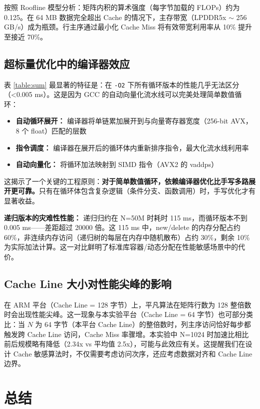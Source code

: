 \documentclass[a4paper]{article}
\begin{document}
按照 Roofline 模型分析：矩阵内积的算术强度（每字节加载的 FLOPs）约为 0.125。在 64 MB 数据完全超出 Cache 的情况下，主存带宽（LPDDR5x $\sim$ 256 GB/s）成为瓶颈。行主序通过最小化 Cache Miss 将有效带宽利用率从 10\% 提升至接近 70\%。

\subsection{超标量优化中的编译器效应}

表 \ref{table:sum} 最显著的特征是：在 \texttt{-O2} 下所有循环版本的性能几乎无法区分（<0.005 ms）。这是因为 GCC 的自动向量化流水线可以完美处理简单数值循环：
\begin{itemize}
    \item \textbf{自动循环展开：} 编译器将单链累加展开到与向量寄存器宽度（256-bit AVX，8 个 float）匹配的层数
    \item \textbf{指令调度：} 编译器在展开后的循环体内重新排序指令，最大化流水线利用率
    \item \textbf{自动向量化：} 将循环加法映射到 SIMD 指令（AVX2 的 vaddps）
\end{itemize}

这揭示了一个关键的工程原则：\textbf{对于简单数值循环，依赖编译器优化比手写多路展开更可靠。}只有在循环体包含复杂逻辑（条件分支、函数调用）时，手写优化才有显著收益。

\textbf{递归版本的灾难性性能：} 递归归约在 N=50M 时耗时 115 ms，而循环版本不到 0.005 ms——差距超过 20000 倍。这 115 ms 中，new/delete 的内存分配占约 60\%，非连续内存访问（递归树的每层在内存中随机散布）占约 30\%，剩余 10\% 为实际加法计算。这一对比鲜明了标准库容器/动态分配在性能敏感场景中的代价。

\subsection{Cache Line 大小对性能尖峰的影响}

在 ARM 平台（Cache Line = 128 字节）上，平凡算法在矩阵行数为 128 整倍数时会出现性能尖峰。这一现象与本实验平台（Cache Line = 64 字节）也可部分类比：当 $N$ 为 64 字节（本平台 Cache Line）的整倍数时，列主序访问恰好每步都触发跨 Cache Line 访问，Cache Miss 率骤增。本实验中 N=1024 时加速比相比前后规模略有降低（2.34x vs 平均值 2.5x），可能与此效应有关。这提醒我们在设计 Cache 敏感算法时，不仅需要考虑访问次序，还应考虑数据对齐和 Cache Line 边界。

\section{总结}
\end{document}
